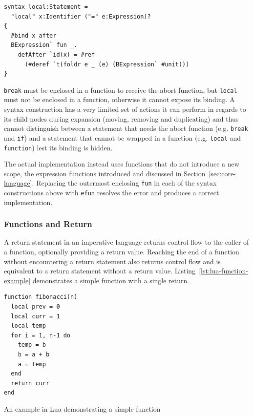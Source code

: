 \documentclass{kththesis}
\begin{document}
\begin{verbatim}
syntax local:Statement =
  "local" x:Identifier ("=" e:Expression)?
{
  #bind x after
  BExpression` fun _.
    defAfter `id(x) = #ref
      (#deref `t(foldr e _ (e) (BExpression` #unit)))
}
\end{verbatim}

\texttt{break} must be enclosed in a function to receive the abort function, but \texttt{local} must not be enclosed in a function, otherwise it cannot expose its binding. A syntax construction has a very limited set of actions it can perform in regards to its child nodes during expansion (moving, removing and duplicating) and thus cannot distinguish between a statement that needs the abort function (e.g. \texttt{break} and \texttt{if}) and a statement that cannot be wrapped in a function (e.g. \texttt{local} and \texttt{function}) lest its binding is hidden.

The actual implementation instead uses functions that do not introduce a new scope, the expression functions introduced and discussed in Section~\ref{sec:core-language}. Replacing the outermost enclosing \texttt{fun} in each of the syntax constructions above with \texttt{efun} resolves the error and produces a correct implementation.

\subsubsection{Functions and Return}

A return statement in an imperative language returns control flow to the caller of a function, optionally providing a return value. Reaching the end of a function without encountering a return statement also returns control flow and is equivalent to a return statement without a return value. Listing~\ref{lst:lua-function-example} demonstrates a simple function with a single return.

\begin{listing}
\begin{verbatim}
function fibonacci(n)
  local prev = 0
  local curr = 1
  local temp
  for i = 1, n-1 do
    temp = b
    b = a + b
    a = temp
  end
  return curr
end
\end{verbatim}
\caption{An example in Lua demonstrating a simple function}
\label{lst:lua-function-example}
\end{listing}
\end{document}
